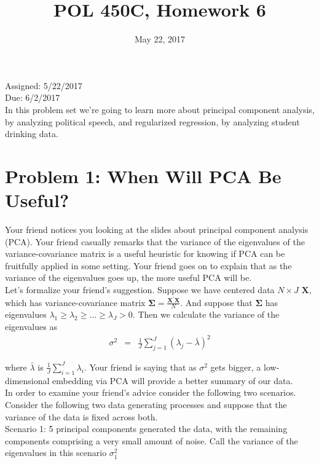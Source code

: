 \documentclass[letterpaper,12pt]{article}
\title{POL 450C, Homework 6}
\date{May 22, 2017}
\numberwithin{equation}{section}
\numberwithin{equation}{section}
\begin{document}
\maketitle

\noindent Assigned: 5/22/2017\\
Due: 6/2/2017\\

In this problem set we're going to learn more about principal component analysis, by analyzing political speech, and regularized regression, by analyzing student drinking data.  



\section*{Problem 1: When Will PCA Be Useful?}
Your friend notices you looking at the slides about principal component analysis (PCA).   Your friend casually remarks that the variance of the eigenvalues of the variance-covariance matrix is a useful heuristic for knowing if PCA can be fruitfully applied in some setting.  Your friend goes on to explain that as the variance of the eigenvalues goes up, the more useful PCA will be.     \\

Let's formalize your friend's suggestion. Suppose we have centered data $N \times J$ $\boldsymbol{X}$, which has variance-covariance matrix $\boldsymbol{\Sigma} = \frac{\boldsymbol{X}^{'}\boldsymbol{X}}{N}$.  And suppose that $\boldsymbol{\Sigma}$ has eigenvalues $\lambda_{1}\geq \lambda_{2}\geq \hdots \geq \lambda_{J}>0$. Then we calculate the variance of the eigenvalues as 
\begin{eqnarray}
\sigma^{2} & = & \frac{1}{J} \sum_{j=1}^{J}(\lambda_{j} - \bar{\lambda})^{2} \nonumber 
\end{eqnarray}

where $\bar{\lambda}$ is $\frac{1}{J} \sum_{i=1}^{J} \lambda_{i}$. Your friend is saying that as $\sigma^{2}$ gets bigger, a low-dimensional embedding via PCA will provide a better summary of our data.   \\

In order to examine your friend's advice consider the following two scenarios. \\

Consider the following two data generating processes and suppose that the variance of the data is fixed across both.  \\


Scenario 1: 5 principal components generated the data, with the remaining components comprising a very small amount of noise.  Call the variance of the eigenvalues in this scenario $\sigma^2_{1}$\\
\end{document}
